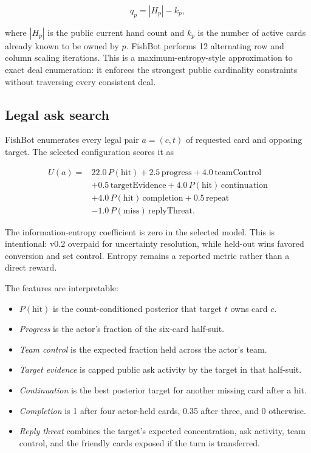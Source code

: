 \documentclass[11pt]{article}
\begin{document}
\begin{equation}
q_p = |H_p| - k_p,
\end{equation}

where $|H_p|$ is the public current hand count and $k_p$ is the number of active cards already known to be owned by $p$. FishBot performs 12 alternating row and column scaling iterations. This is a maximum-entropy-style approximation to exact deal enumeration: it enforces the strongest public cardinality constraints without traversing every consistent deal.

\subsection{Legal ask search}

FishBot enumerates every legal pair $a=(c,t)$ of requested card and opposing target. The selected configuration scores it as

\begin{align}
U(a) ={}& 22.0\,P(\mathrm{hit})
 + 2.5\,\mathrm{progress}
 + 4.0\,\mathrm{teamControl} \\
&+ 0.5\,\mathrm{targetEvidence}
 + 4.0\,P(\mathrm{hit})\,\mathrm{continuation} \\
&+ 4.0\,P(\mathrm{hit})\,\mathrm{completion}
 + 0.5\,\mathrm{repeat} \\
&- 1.0\,P(\mathrm{miss})\,\mathrm{replyThreat}.
\end{align}

The information-entropy coefficient is zero in the selected model. This is intentional: v0.2 overpaid for uncertainty resolution, while held-out wins favored conversion and set control. Entropy remains a reported metric rather than a direct reward.

The features are interpretable:

\begin{itemize}
  \item $P(\mathrm{hit})$ is the count-conditioned posterior that target $t$ owns card $c$.
  \item \emph{Progress} is the actor's fraction of the six-card half-suit.
  \item \emph{Team control} is the expected fraction held across the actor's team.
  \item \emph{Target evidence} is capped public ask activity by the target in that half-suit.
  \item \emph{Continuation} is the best posterior target for another missing card after a hit.
  \item \emph{Completion} is 1 after four actor-held cards, 0.35 after three, and 0 otherwise.
  \item \emph{Reply threat} combines the target's expected concentration, ask activity, team control, and the friendly cards exposed if the turn is transferred.
\end{itemize}
\end{document}
